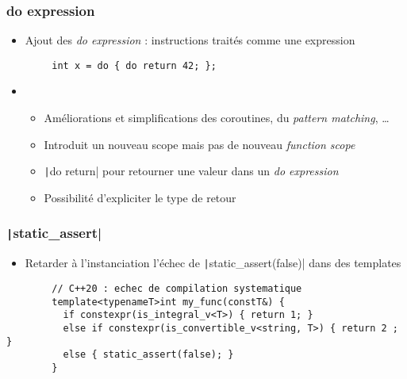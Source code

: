 \documentclass[C++.tex]{subfiles}
\begin{document}
\begin{frame}[fragile]
	\frametitle{do expression}
	\begin{itemize}
		\item Ajout des \og{}\textit{do expression}\fg{} : instructions traités comme une expression
	\end{itemize}

	\begin{verbatim}
		int x = do { do return 42; };
	\end{verbatim}

	\begin{itemize}
		\item[]
		\begin{itemize}
			\item Améliorations et simplifications des coroutines, du \textit{pattern matching}, \ldots{}
			\item Introduit un nouveau scope mais pas de nouveau \textit{function scope}
			\item \texttt|do return| pour retourner une valeur dans un \textit{do expression}
			\item Possibilité d'expliciter le type de retour
		\end{itemize}
	\end{itemize}

\end{frame}

\begin{frame}[fragile]
	\frametitle{\texttt|static_assert|}
	\begin{itemize}
		\item Retarder à l'instanciation l'échec de \texttt|static_assert(false)| dans des templates
	\end{itemize}

	\begin{verbatim}
		// C++20 : echec de compilation systematique
		template<typenameT>int my_func(constT&) {
		  if constexpr(is_integral_v<T>) { return 1; }
		  else if constexpr(is_convertible_v<string, T>) { return 2 ; }
		  else { static_assert(false); }
		}
	\end{verbatim}

\end{frame}
\end{document}

